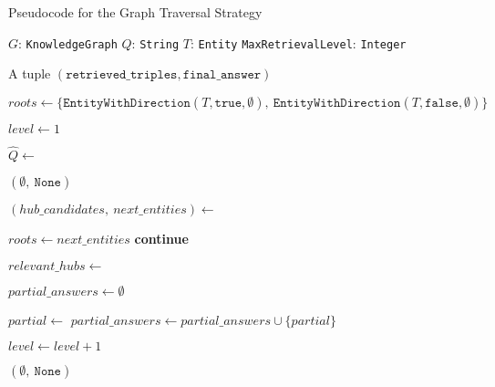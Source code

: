 \begin{algorithm}[t]
\caption{Pseudocode for the Graph Traversal Strategy}
\label{alg:hublink_graph_traversal_strategy}
\begin{algorithmic}[1]
\PersistentState
    \Statex $G$: \texttt{KnowledgeGraph} 
\Require
    \Statex $Q$: \texttt{String} 
    \Statex $T$: \texttt{Entity} 
    \Statex \texttt{MaxRetrievalLevel}: \texttt{Integer} 

\Ensure
    \Statex A tuple \((\texttt{retrieved\_triples}, \texttt{final\_answer})\)

\Statex
{}
    
    \State $roots \gets \{ \texttt{EntityWithDirection}(T, \texttt{true}, \emptyset),\ \texttt{EntityWithDirection}(T, \texttt{false}, \emptyset) \}$
    
    \State $level \gets 1$
    
    \State $\hat{Q} \gets$ 

            \State \Return $(\emptyset,\ \texttt{None})$ 
        \EndIf

        \State $(hub\_candidates,\ next\_entities) \gets$ 
        
        \State $roots \gets next\_entities$
            \State \textbf{continue} 
        \EndIf

        \State $relevant\_hubs \gets $ 
        
        \State $partial\_answers \gets \emptyset$
    
            \State $partial \gets$ 
            \State $partial\_answers \gets partial\_answers \cup \{partial\}$
        \EndFor

            \State \Return {}
        \EndIf

        \State $level \gets level + 1$

    \EndWhile
    \State \Return $(\emptyset,\ \texttt{None})$ 
\EndFunction
\end{algorithmic}
\end{algorithm}

